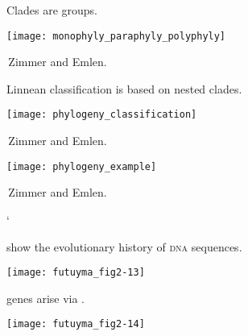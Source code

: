 \documentclass[t]{beamer}
\begin{document}
\begin{frame}[t,plain]{Clades are  groups.}
	
	\centering
	\vspace{-0.5\baselineskip}
	
	\texttt{[image: monophyly\_paraphyly\_polyphyly]}
	
	\vfilll
	\tiny \hfill \textcopyright\,Zimmer and Emlen.
\end{frame}
%
\begin{frame}[t,plain]{Linnean classification is based on nested clades.}
	
	\centering
	\vspace{-0.5\baselineskip}
	
	\texttt{[image: phylogeny\_classification]}
	
	\vfilll
	\tiny \hfill \textcopyright\,Zimmer and Emlen.
\end{frame}
%
\begin{frame}[t,plain]
	
	\centering
	
	\texttt{[image: phylogeny\_example]}
	
	\vfilll
	\tiny \hfill \textcopyright\,Zimmer and Emlen.
	
	\pause
	
`\end{frame}
%
\begin{frame}[t,plain]{ show the evolutionary history of \textsc{dna} sequences.}

	\centering
	\vspace{-0.75\baselineskip}

	\texttt{[image: futuyma\_fig2-13]}

\end{frame}
%
\begin{frame}[t,plain]{ genes arise via .}

	\centering
	\vspace{-0.25\baselineskip}

	\texttt{[image: futuyma\_fig2-14]}

\end{frame}
\end{document}

